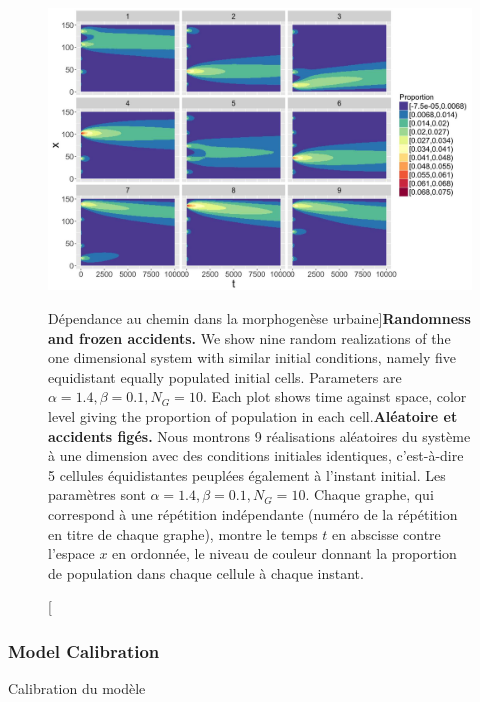 \begin{figure}[h!]
\includegraphics[width=\linewidth]{Figures/Final/5-2-2-fig-density-fig4}
\caption[Randomness and frozen accidents][Dépendance au chemin dans la morphogenèse urbaine]{\textbf{Randomness and frozen accidents.} We show nine random realizations of the one dimensional system with similar initial conditions, namely five equidistant equally populated initial cells. Parameters are $\alpha = 1.4,\beta =0.1,N_G=10$. Each plot shows time against space, color level giving the proportion of population in each cell.\label{fig:density:fig4}}{\textbf{Aléatoire et accidents figés.} Nous montrons 9 réalisations aléatoires du système à une dimension avec des conditions initiales identiques, c'est-à-dire 5 cellules équidistantes peuplées également à l'instant initial. Les paramètres sont $\alpha = 1.4,\beta =0.1,N_G=10$. Chaque graphe, qui correspond à une répétition indépendante (numéro de la répétition en titre de chaque graphe), montre le temps $t$ en abscisse contre l'espace $x$ en ordonnée, le niveau de couleur donnant la proportion de population dans chaque cellule à chaque instant.\label{fig:density:fig4}}
\end{figure}





\subsubsection{Model Calibration}{Calibration du modèle}


